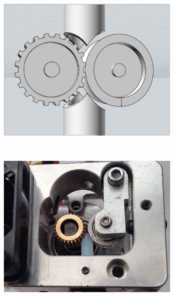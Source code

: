 \documentclass[11pt,a4paper]{article}
\begin{document}
\begin{figure}[H]
    \centering
    \begin{subfigure}[b]{0.3\textwidth}
        \includegraphics[width=\textwidth,cfbox=azul_marcos 4pt 0pt]{FOTOS/TEFLON1}
    \end{subfigure}
    ~ %
    \begin{subfigure}[b]{0.3\textwidth}
        \includegraphics[width=\textwidth,cfbox=azul_marcos 4pt 0pt]{FOTOS/TEFLON2}
    \end{subfigure}

\end{figure}
\end{document}
